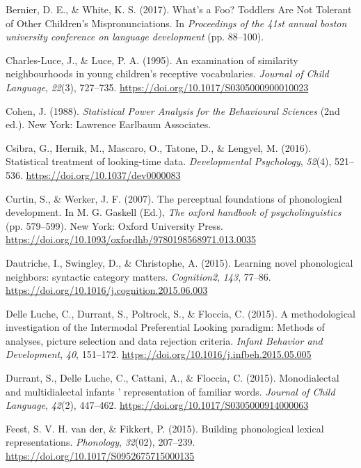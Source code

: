 \documentclass[
  english,
  man, noextraspace]{apa6}
\newlength{\cslhangindent}
\newenvironment{cslreferences}%
  {\setlength{\parindent}{0pt}%
  \everypar{\setlength{\hangindent}{\cslhangindent}}\ignorespaces}%
  {\par}
\begin{document}
\begin{cslreferences}
\leavevmode\hypertarget{ref-Bernier2017}{}%
Bernier, D. E., \& White, K. S. (2017). What's a Foo? Toddlers Are Not Tolerant of Other Children's Mispronunciations. In \emph{Proceedings of the 41st annual boston university conference on language development} (pp. 88--100).

\leavevmode\hypertarget{ref-CharlesLuce1995}{}%
Charles-Luce, J., \& Luce, P. A. (1995). An examination of similarity neighbourhoods in young children's receptive vocabularies. \emph{Journal of Child Language}, \emph{22}(3), 727--735. \url{https://doi.org/10.1017/S0305000900010023}

\leavevmode\hypertarget{ref-cohen}{}%
Cohen, J. (1988). \emph{Statistical Power Analysis for the Behavioural Sciences} (2nd ed.). New York: Lawrence Earlbaum Associates.

\leavevmode\hypertarget{ref-Csibra2016}{}%
Csibra, G., Hernik, M., Mascaro, O., Tatone, D., \& Lengyel, M. (2016). Statistical treatment of looking-time data. \emph{Developmental Psychology}, \emph{52}(4), 521--536. \url{https://doi.org/10.1037/dev0000083}

\leavevmode\hypertarget{ref-Curtin2007}{}%
Curtin, S., \& Werker, J. F. (2007). The perceptual foundations of phonological development. In M. G. Gaskell (Ed.), \emph{The oxford handbook of psycholinguistics} (pp. 579--599). New York: Oxford University Press. \url{https://doi.org/10.1093/oxfordhb/9780198568971.013.0035}

\leavevmode\hypertarget{ref-Dautriche2015}{}%
Dautriche, I., Swingley, D., \& Christophe, A. (2015). Learning novel phonological neighbors: syntactic category matters. \emph{Cognition2}, \emph{143}, 77--86. \url{https://doi.org/10.1016/j.cognition.2015.06.003}

\leavevmode\hypertarget{ref-DelleLuche2015}{}%
Delle Luche, C., Durrant, S., Poltrock, S., \& Floccia, C. (2015). A methodological investigation of the Intermodal Preferential Looking paradigm: Methods of analyses, picture selection and data rejection criteria. \emph{Infant Behavior and Development}, \emph{40}, 151--172. \url{https://doi.org/10.1016/j.infbeh.2015.05.005}

\leavevmode\hypertarget{ref-Durrant2014}{}%
Durrant, S., Delle Luche, C., Cattani, A., \& Floccia, C. (2015). Monodialectal and multidialectal infants ' representation of familiar words. \emph{Journal of Child Language}, \emph{42}(2), 447--462. \url{https://doi.org/10.1017/S0305000914000063}

\leavevmode\hypertarget{ref-vanderFeest2015}{}%
Feest, S. V. H. van der, \& Fikkert, P. (2015). Building phonological lexical representations. \emph{Phonology}, \emph{32}(02), 207--239. \url{https://doi.org/10.1017/S0952675715000135}


\end{cslreferences}
\end{document}
